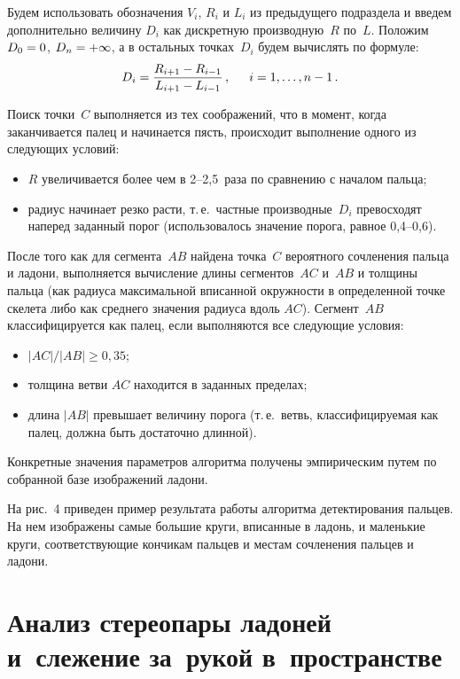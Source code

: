 \begin{multicols}{2}
Будем использовать обозначения $V_i$, $R_i$ и $L_i$ из предыдущего подраздела
и введем дополнительно величину $D_i$ как дискретную производную~$R$ по~$L$.
Положим $D_0 \hm= 0$, $D_n \hm= + \infty$, а в остальных точках~$D_i$ будем вычислять по формуле:
\begin{equation*}
D_i = \displaystyle\frac{\displaystyle R_{i+1} - R_{i-1}\mathstrut}{\displaystyle L_{i+1} - L_{i - 1}\mathstrut}\,,\enskip \quad i = 1,
\ldots, n-1\,.
\end{equation*}

Поиск точки~$C$ выполняется из тех соображений, что в момент, 
когда заканчивается палец и начинается пясть,
происходит выполнение одного из следующих условий:
\begin{itemize}
\item $R$ увеличивается более чем в 2--2,5~раза по сравнению с началом пальца;
\item радиус начинает резко расти, т.\,е.\ частные производные~$D_i$ 
превосходят наперед заданный порог (использовалось значение порога, рав\-ное 0,4--0,6).
\end{itemize}

После того как для сегмента~$AB$ найдена точка~$C$ вероятного
сочленения пальца и ладони, выполняется вычисление длины сегментов~$AC$ и~$AB$ 
и толщины пальца (как радиуса максимальной вписанной
окружности в определенной точке скелета либо как среднего значения
радиуса вдоль $AC$). Сегмент~$AB$ классифицируется как палец, если
выполняются все следующие условия:
\begin{itemize}
\item $|AC| / |AB| \ge 0{,}35$;
\item толщина ветви $AC$ находится в заданных пределах;
\item длина $|AB|$ превышает величину порога (т.\,е.\ 
ветвь, классифицируемая как палец, должна быть достаточно длинной).
\end{itemize}

Конкретные значения параметров алгоритма получены эмпирическим путем 
по собранной базе изображений ладони.

На рис.~4 приведен пример результата 
работы алгоритма детектирования пальцев.
На нем изображены самые большие круги, вписанные в ладонь,
и маленькие круги, соответствующие кончикам пальцев и местам сочленения пальцев и ладони.


\section{Анализ стереопары ладоней и~слежение за~рукой в~пространстве}\label{sec:HandTracking3D}


\end{multicols}
